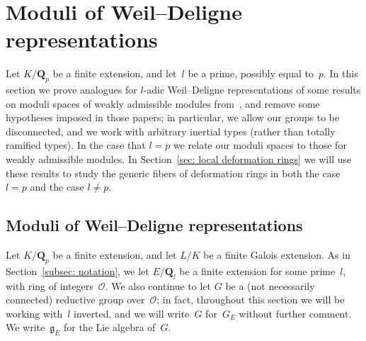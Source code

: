 \documentclass{amsart}
\renewcommand{\mathbb}{\mathbf}
\renewcommand{\ell}{l}
\def\fg{\mathfrak{g}}
\theoremstyle{definition}
\theoremstyle{remark}
\newcommand{\mar}[1]{}
\newcommand{\mar}[1]{\marginpar{\raggedright\tiny squirrel #1}}
\newcommand{\Q}{\QQ}
\newcommand{\QQ}{{\mathbb Q}}
\newcommand{\cO}{{\mathcal O}}
\newcommand{\Ql}{\Q_{\ell}}
\newcommand{\Qp}{\Q_p}
\DeclareMathOperator{\Gal}{Gal}
\begin{document}
\section{Moduli of Weil--Deligne representations}\label{sec: moduli of
  WD representations}Let $K/\Qp$ be a finite extension, and let~$l$ be
a prime, possibly equal to~$p$. In this section we prove analogues for $l$-adic
Weil--Deligne representations of some results on moduli spaces of weakly admissible modules
from~\cite{MR2373358,2014arXiv1403.1411B}, and remove some hypotheses imposed in
those papers; in particular, we allow our groups to be disconnected, and
we work with arbitrary inertial types (rather than totally ramified
types). In the case that $l=p$ we relate our moduli spaces to those
for weakly admissible modules. In Section~\ref{sec: local deformation
  rings} we will use these results to study the generic fibers of
deformation rings in both the case $l=p$ and the case $l\ne p$. 
\subsection{Moduli of Weil--Deligne representations}Let $K/\Q_p$ be a finite extension,
and let %
$L/K$ be a finite Galois extension. As in Section~\ref{subsec:
  notation}, we let $E/\Ql$ be a finite extension
for some prime~$l$, with ring of integers~$\cO$. %
We also continue to let $G$ be a (not necessarily connected) reductive
group over~$\cO$; in fact, throughout this section we will be working
with~$l$ inverted, and we will write~$G$ for~$G_E$ without further
comment. We write~$\fg_E$ for the Lie algebra of~$G$. 

\end{document}
